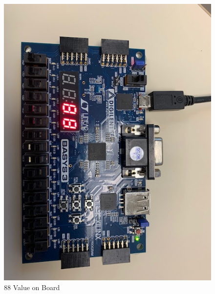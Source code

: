 \documentclass[11pt]{article}
\begin{document}
	\begin{figure}[ht]\centering
		
		
		
		\includegraphics[width=1\textwidth,angle=0,origin=c]{88.jpg}
		\caption{88 Value on Board}
		\label{fig:88_value}
		
	\end{figure}
	
\end{document}
